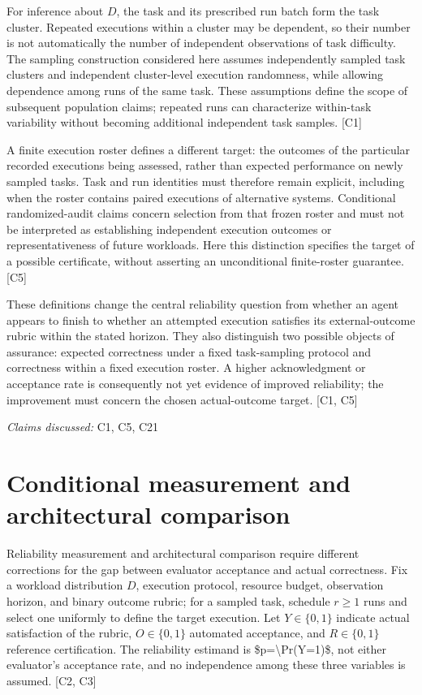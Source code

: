 \documentclass[11pt]{article}
\begin{document}
For inference about $D$, the task and its prescribed run batch form the task cluster. Repeated executions within a cluster may be dependent, so their number is not automatically the number of independent observations of task difficulty. The sampling construction considered here assumes independently sampled task clusters and independent cluster-level execution randomness, while allowing dependence among runs of the same task. These assumptions define the scope of subsequent population claims; repeated runs can characterize within-task variability without becoming additional independent task samples. [C1]

A finite execution roster defines a different target: the outcomes of the particular recorded executions being assessed, rather than expected performance on newly sampled tasks. Task and run identities must therefore remain explicit, including when the roster contains paired executions of alternative systems. Conditional randomized-audit claims concern selection from that frozen roster and must not be interpreted as establishing independent execution outcomes or representativeness of future workloads. Here this distinction specifies the target of a possible certificate, without asserting an unconditional finite-roster guarantee. [C5]

These definitions change the central reliability question from whether an agent appears to finish to whether an attempted execution satisfies its external-outcome rubric within the stated horizon. They also distinguish two possible objects of assurance: expected correctness under a fixed task-sampling protocol and correctness within a fixed execution roster. A higher acknowledgment or acceptance rate is consequently not yet evidence of improved reliability; the improvement must concern the chosen actual-outcome target. [C1, C5]

\textit{Claims discussed: }C1, C5, C21
\section{Conditional measurement and architectural comparison}
Reliability measurement and architectural comparison require different corrections for the gap between evaluator acceptance and actual correctness. Fix a workload distribution $D$, execution protocol, resource budget, observation horizon, and binary outcome rubric; for a sampled task, schedule $r\geq 1$ runs and select one uniformly to define the target execution. Let $Y\in\{0,1\}$ indicate actual satisfaction of the rubric, $O\in\{0,1\}$ automated acceptance, and $R\in\{0,1\}$ reference certification. The reliability estimand is \$p=\textbackslash{}Pr(Y=1)\$, not either evaluator\textquoteright{}s acceptance rate, and no independence among these three variables is assumed. [C2, C3]
\end{document}
